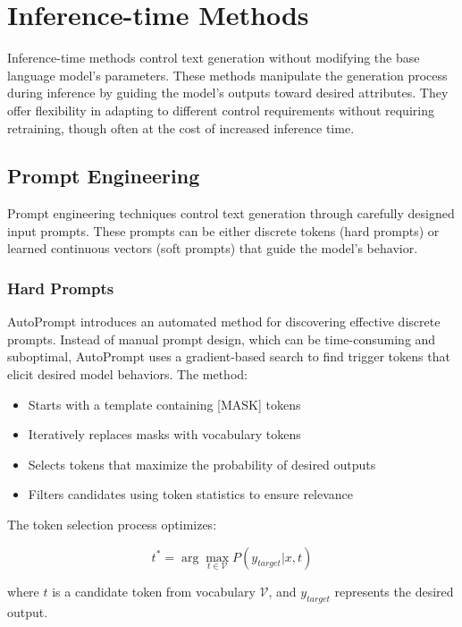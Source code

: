 \section{Inference-time Methods}
\label{c2:s:inference}

Inference-time methods control text generation without modifying the base language model's parameters. These methods manipulate the generation process during inference by guiding the model's outputs toward desired attributes. They offer flexibility in adapting to different control requirements without requiring retraining, though often at the cost of increased inference time.

\subsection{Prompt Engineering}

Prompt engineering techniques control text generation through carefully designed input prompts. These prompts can be either discrete tokens (hard prompts) or learned continuous vectors (soft prompts) that guide the model's behavior.

\subsubsection{Hard Prompts}

AutoPrompt introduces an automated method for discovering effective discrete prompts. Instead of manual prompt design, which can be time-consuming and suboptimal, AutoPrompt uses a gradient-based search to find trigger tokens that elicit desired model behaviors. The method:

\begin{itemize}
    \item Starts with a template containing [MASK] tokens
    \item Iteratively replaces masks with vocabulary tokens
    \item Selects tokens that maximize the probability of desired outputs
    \item Filters candidates using token statistics to ensure relevance
\end{itemize}

The token selection process optimizes:

\begin{equation}
    t^* = \arg\max_{t \in \mathcal{V}} P(y_{target}|x, t)
\end{equation}

where $t$ is a candidate token from vocabulary $\mathcal{V}$, and $y_{target}$ represents the desired output.

